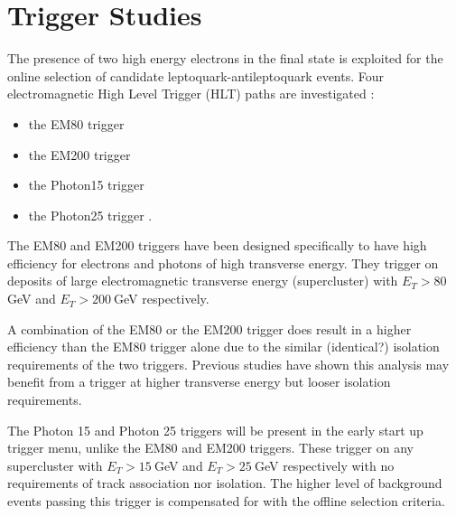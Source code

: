 %
\section{Trigger Studies} \label{sec:trig}

The presence of two high energy electrons in the final state is exploited for the online selection 
of candidate leptoquark-antileptoquark events. 
Four electromagnetic High Level Trigger (HLT) paths are investigated
:
\begin{itemize}
\item the EM80 trigger 
\item the EM200 trigger 
\item the Photon15 trigger 
\item the Photon25 trigger .
\end{itemize}

The EM80 and EM200 triggers have been designed specifically to have high 
efficiency for electrons and photons of high transverse energy. 
They trigger on deposits of large electromagnetic transverse energy (supercluster) with
$E_T>80~$GeV and $E_T>200~$GeV respectively.

A combination of the EM80 or the EM200 trigger does result in a higher efficiency than the EM80 trigger 
alone due to the similar (identical?) isolation requirements of the two triggers.  Previous studies have shown
 this analysis may benefit from a trigger at higher transverse energy but looser isolation requirements.
 
 
The Photon 15 and Photon 25 triggers will be present in the early start up trigger menu, 
unlike the EM80 and EM200 triggers.  These trigger on any supercluster with 
$E_T>15~$GeV and $E_T>25~$GeV respectively with no requirements of track 
association nor isolation.  The higher level of background events passing this trigger is compensated 
for with the offline selection criteria.

